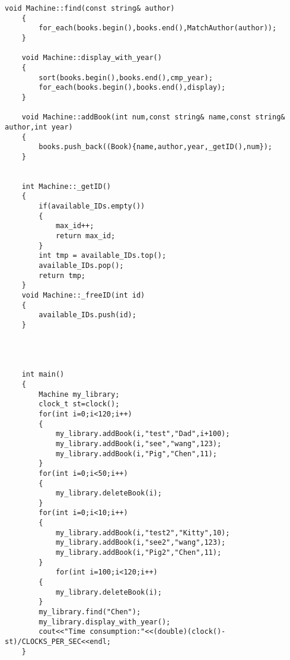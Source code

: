 \documentclass[UTF8]{ctexart}
\begin{document}
\begin{lstlisting}[language={[ANSI]C++}]
    void Machine::find(const string& author)
    {
        for_each(books.begin(),books.end(),MatchAuthor(author));
    }
    
    void Machine::display_with_year()
    {
        sort(books.begin(),books.end(),cmp_year);
        for_each(books.begin(),books.end(),display);
    }
    
    void Machine::addBook(int num,const string& name,const string& author,int year)
    {
        books.push_back((Book){name,author,year,_getID(),num});
    }
    
    
    int Machine::_getID()
    {
        if(available_IDs.empty())
        {
            max_id++;
            return max_id;
        }
        int tmp = available_IDs.top();
        available_IDs.pop();
        return tmp;
    }
    void Machine::_freeID(int id)
    {
        available_IDs.push(id);
    }
    
    
    
    
    int main()
    {
        Machine my_library;
        clock_t st=clock();
        for(int i=0;i<120;i++)
        {
            my_library.addBook(i,"test","Dad",i+100);
            my_library.addBook(i,"see","wang",123);
            my_library.addBook(i,"Pig","Chen",11);
        } 
        for(int i=0;i<50;i++)
        {
            my_library.deleteBook(i);
        }
        for(int i=0;i<10;i++)
        {
            my_library.addBook(i,"test2","Kitty",10);
            my_library.addBook(i,"see2","wang",123);
            my_library.addBook(i,"Pig2","Chen",11);
        }
            for(int i=100;i<120;i++)
        {
            my_library.deleteBook(i);
        } 
        my_library.find("Chen");
        my_library.display_with_year();
        cout<<"Time consumption:"<<(double)(clock()-st)/CLOCKS_PER_SEC<<endl;
    }
\end{lstlisting}
\end{document}
